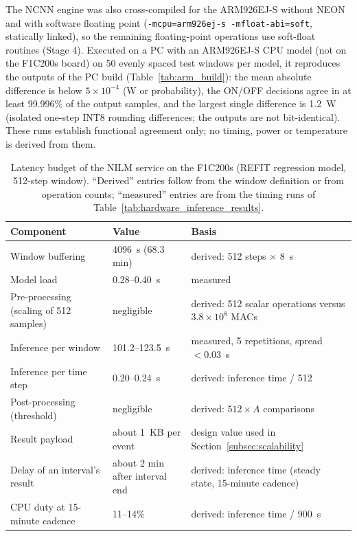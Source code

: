 The NCNN engine was also cross-compiled for the ARM926EJ-S without NEON and with software floating point (\texttt{-mcpu=arm926ej-s -mfloat-abi=soft}, statically linked), so the remaining floating-point operations use soft-float routines (Stage 4). Executed on a PC with an ARM926EJ-S CPU model (not on the F1C200s board) on 50 evenly spaced test windows per model, it reproduces the outputs of the PC build (Table~\ref{tab:arm_build}): the mean absolute difference is below $5\times10^{-4}$ (W or probability), the ON/OFF decisions agree in at least 99.996\% of the output samples, and the largest single difference is 1.2~W (isolated one-step INT8 rounding differences; the outputs are not bit-identical). These runs establish functional agreement only; no timing, power or temperature is derived from them.


\begin{table}[H]
\centering
\caption{Latency budget of the NILM service on the F1C200s (REFIT regression model, 512-step window). ``Derived'' entries follow from the window definition or from operation counts; ``measured'' entries are from the timing runs of Table~\ref{tab:hardware_inference_results}.}
\label{tab:latency}
\footnotesize
\begin{tabular}{@{}p{3.3cm}p{1.9cm}p{4.2cm}@{}}
\toprule
Component & Value & Basis \\
\midrule
Window buffering & 4096~s (68.3 min) & derived: 512 steps $\times$ 8~s \\
Model load & 0.28--0.40~s & measured \\
Pre-processing (scaling of 512 samples) & negligible & derived: 512 scalar operations versus $3.8\times10^{8}$ MACs \\
Inference per window & 101.2--123.5~s & measured, 5 repetitions, spread $<0.03$~s \\
Inference per time step & 0.20--0.24~s & derived: inference time / 512 \\
Post-processing (threshold) & negligible & derived: $512\times A$ comparisons \\
Result payload & about 1~KB per event & design value used in Section~\ref{subsec:scalability} \\
Delay of an interval's result & about 2 min after interval end & derived: inference time (steady state, 15-minute cadence) \\
CPU duty at 15-minute cadence & 11--14\% & derived: inference time / 900~s \\
\bottomrule
\end{tabular}
\end{table}

